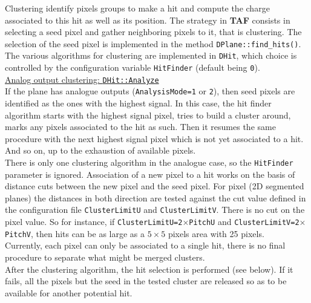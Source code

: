 \documentclass[a4paper, 12pt, twoside]{article}
\newcommand{\TAF}{{\bf TAF }}
\begin{document}
\noindent
Clustering identify pixels groups to make a hit and compute the charge associated to this hit as well as its position. The strategy in \TAF consists in selecting a seed pixel and gather neighboring pixels to it, that is clustering. The selection of the seed pixel is implemented in the method {\tt DPlane::find\_hits()}. The various algorithms for clustering are implemented in {\tt DHit}, which choice is controlled by the configuration variable {\tt HitFinder} (default being {\tt 0}).\\

\noindent
\hspace{1cm} \underline{Analog output clustering: {\tt DHit::Analyze}}\\
\noindent
If the plane has analogue outputs ({\tt AnalysisMode=1} or {\tt 2}), then seed pixels are identified as the ones with the highest signal. In this case, the hit finder algorithm starts with the highest signal pixel, tries to build a cluster around, marks any pixels associated to the hit as such. Then it resumes the same procedure with the next highest signal pixel which is not yet associated to a hit. And so on, up to the exhaustion of available pixels.\\

\noindent
There is only one clustering algorithm in the analogue case, so the {\tt HitFinder} parameter is ignored. Association of a new pixel to a hit works on the basis of distance cuts between the new pixel and the seed pixel. For pixel (2D segmented planes) the distances in both direction are tested against the cut value defined in the configuration file {\tt ClusterLimitU} and {\tt ClusterLimitV}. There is no cut on the pixel value. So for instance, if {\tt ClusterLimitU=2$\times$PitchU} and {\tt ClusterLimitV=2$\times$PitchV}, then hits can be as large as a $5\times5$ pixels area with 25 pixels.\\  
Currently, each pixel can only be associated to a single hit, there is no final procedure to separate what might be merged clusters.\\

\noindent
After the clustering algorithm, the hit selection is performed (see below). If it fails, all the pixels but the seed in the tested cluster are released so as to be available for another potential hit.\\
\end{document}
